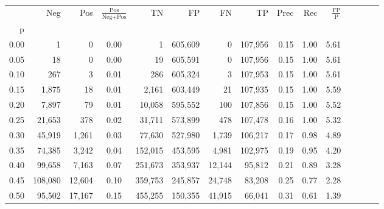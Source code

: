 \begin{tabular}{rrrcrrrrrrrrrrr}
\toprule
{} &      Neg &     Pos & $\frac{\text{Pos}}{\text{Neg}+\text{Pos}}$ &       TN &       FP &       FN &       TP &  Prec &   Rec & $\frac{\text{FP}}{\text{P}}$ \\
p    &          &         &                                            &          &          &          &          &       &       &                              \\
\midrule
0.00 &        1 &       0 &                                       0.00 &        1 &  605,609 &        0 &  107,956 &  0.15 &  1.00 &                         5.61 \\
0.05 &       18 &       0 &                                       0.00 &       19 &  605,591 &        0 &  107,956 &  0.15 &  1.00 &                         5.61 \\
0.10 &      267 &       3 &                                       0.01 &      286 &  605,324 &        3 &  107,953 &  0.15 &  1.00 &                         5.61 \\
0.15 &    1,875 &      18 &                                       0.01 &    2,161 &  603,449 &       21 &  107,935 &  0.15 &  1.00 &                         5.59 \\
0.20 &    7,897 &      79 &                                       0.01 &   10,058 &  595,552 &      100 &  107,856 &  0.15 &  1.00 &                         5.52 \\
0.25 &   21,653 &     378 &                                       0.02 &   31,711 &  573,899 &      478 &  107,478 &  0.16 &  1.00 &                         5.32 \\
0.30 &   45,919 &   1,261 &                                       0.03 &   77,630 &  527,980 &    1,739 &  106,217 &  0.17 &  0.98 &                         4.89 \\
0.35 &   74,385 &   3,242 &                                       0.04 &  152,015 &  453,595 &    4,981 &  102,975 &  0.19 &  0.95 &                         4.20 \\
0.40 &   99,658 &   7,163 &                                       0.07 &  251,673 &  353,937 &   12,144 &   95,812 &  0.21 &  0.89 &                         3.28 \\
0.45 &  108,080 &  12,604 &                                       0.10 &  359,753 &  245,857 &   24,748 &   83,208 &  0.25 &  0.77 &                         2.28 \\
0.50 &   95,502 &  17,167 &                                       0.15 &  455,255 &  150,355 &   41,915 &   66,041 &  0.31 &  0.61 &                         1.39 \\

\end{tabular}
